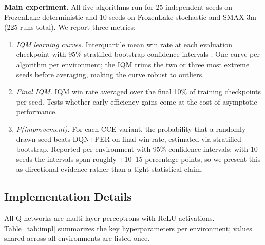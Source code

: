 \documentclass[conference]{IEEEtran}
\begin{document}
\textbf{Main experiment.} All five algorithms run for 25 independent seeds on FrozenLake deterministic and 10 seeds on FrozenLake stochastic and SMAX 3m (225 runs total). We report three metrics:

\begin{enumerate}
    \item \emph{IQM learning curves.} Interquartile mean win rate at each evaluation checkpoint with 95\% stratified bootstrap confidence intervals \cite{agarwal2021deep}. One curve per algorithm per environment; the IQM trims the two or three most extreme seeds before averaging, making the curve robust to outliers.

    \item \emph{Final IQM.} IQM win rate averaged over the final 10\% of training checkpoints per seed. Tests whether early efficiency gains come at the cost of asymptotic performance.

    \item \emph{P(improvement).} For each CCE variant, the probability that a randomly drawn seed beats DQN+PER on final win rate, estimated via stratified bootstrap. Reported per environment with 95\% confidence intervals; with 10 seeds the intervals span roughly $\pm$10--15 percentage points, so we present this as directional evidence rather than a tight statistical claim.
\end{enumerate}

\subsection{Implementation Details}

\noindent All Q-networks are multi-layer perceptrons with ReLU activations. Table~\ref{tab:impl} summarizes the key hyperparameters per environment; values shared across all environments are listed once.
\end{document}

